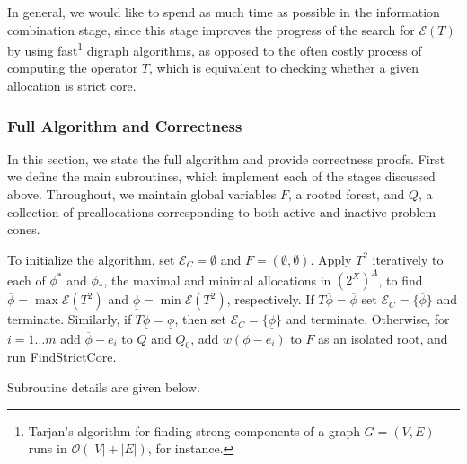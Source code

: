 \documentclass[11pt,reqno]{amsart}
\theoremstyle{definition}
\numberwithin{equation}{section}
\newcommand{\ol}{\overline}
\newcommand{\ul}{\underline}
\newcommand{\pre}{\phi}
\newcommand{\prealloc}{(2^X)^A}
\newcommand{\fix}{\mathcal{E}}
\newcommand{\toppre}{\ol{\pre}}
\newcommand{\acto}{Q_0}
\newcommand{\act}{Q}
\newcommand{\forest}{F}
\newcommand{\fixfind}{\mathcal{E}_C}
\begin{document}
In general, we would like to spend as much time as possible in the information combination stage, since this stage improves the progress of the search for $\fix(T)$ by using fast\footnote{Tarjan's algorithm for finding strong components of a graph $G = (V,E)$ runs in $\mathcal{O}(|V| + |E|)$, for instance.} digraph algorithms, as opposed to the often costly process of computing the operator $T$, which is equivalent to checking whether a given allocation is strict core.  

\subsubsection{Full Algorithm and Correctness} \label{fullalgo}
In this section, we state the full algorithm and provide correctness proofs.
First we define the main subroutines, which implement each of the stages discussed above.
Throughout, we maintain global variables $\forest$, a rooted forest, and $\act$, a collection of preallocations corresponding to both active and inactive problem cones.

To initialize the algorithm, set $\fixfind = \emptyset$ and $F = (\emptyset,\emptyset)$. 
Apply $T^2$ iteratively to each of $\pre^*$ and $\pre_*$, the maximal and minimal allocations in $\prealloc$, to find $\toppre = \max \fix(T^2)$ and $\ul{\pre} = \min \fix(T^2)$, respectively.
If $T\toppre = \toppre$ set $\fixfind = \{\toppre\}$ and terminate.
Similarly, if $T\ul{\pre} = \ul{\pre}$, then set $\fixfind = \{\ul{\pre}\}$ and terminate. 
Otherwise, for $i = 1 \hdots m$ add $\toppre - e_i$ to $\act$ and $\acto$, add $w(\pre - e_i)$ to $F$ as an isolated root, and run FindStrictCore. 

Subroutine details are given below.
 
\end{document}
